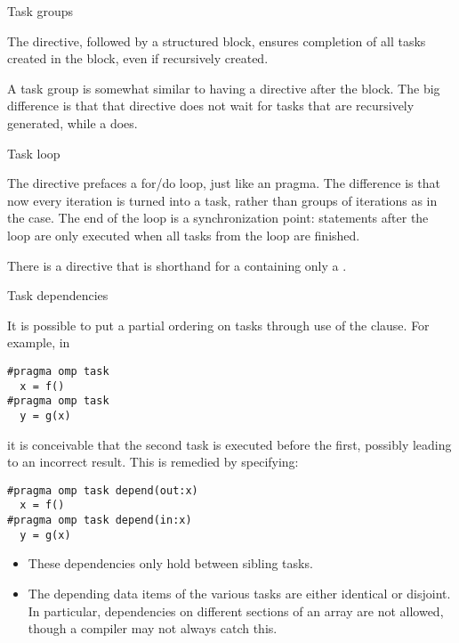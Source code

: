 
 {Task groups}
\label{sec:omp-task-group}

The  directive, followed
by a structured block, ensures completion of all tasks
created in the block, even if recursively created.

A task group is somewhat similar to having a 
directive after the block. The big difference is that that
 directive does not wait for tasks that are recursively
generated, while a  does.

 {Task loop}
\label{sec:omp-task-loop}

The  directive
prefaces a for/do loop, just like an  pragma.
The difference is that now every iteration is turned into a task,
rather than groups of iterations as in the  case.
The end of the loop is a synchronization point:
statements after the loop are only executed
when all tasks from the loop are finished.

There is a  directive
that is shorthand for a 
containing only a .

 {Task dependencies}
\label{sec:omp-task-depend}

It is possible to put a partial ordering on
tasks through use of the  clause. For example, in
\begin{lstlisting}
#pragma omp task
  x = f()
#pragma omp task
  y = g(x)
\end{lstlisting}
it is conceivable that the second task is executed before the first,
possibly leading to an incorrect result. This is remedied by specifying:
\begin{lstlisting}
#pragma omp task depend(out:x)
  x = f()
#pragma omp task depend(in:x)
  y = g(x)
\end{lstlisting}

\begin{itemize}
\item
  These dependencies only hold between sibling tasks.
\item The depending data items of the various tasks
  are either identical or disjoint.
  In particular, dependencies on different sections of an array
  are not allowed, though a compiler may not always catch this.
\end{itemize}

